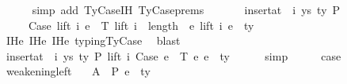 \begin{isabellebody}
\ \ \ \ \isamarkupfalse%
\ {\isacharparenleft}{\kern0pt}simp\ add{\isacharcolon}{\kern0pt}\ TyCase{\isachardot}{\kern0pt}IH{\isacharparenleft}{\kern0pt}{}{\isacharparenright}{\kern0pt}\ TyCase{\isachardot}{\kern0pt}prems{\isacharparenright}{\kern0pt}\isanewline
\isanewline
\ \ \isamarkupfalse%
\isanewline
\ \ \ \ {\isachardoublequoteopen}insert{\isacharunderscore}{\kern0pt}at\ {\isasymGamma}\ i\ {\isacharparenleft}{\kern0pt}ys{\isacharcomma}{\kern0pt}\ ty{}{\isacharparenright}{\kern0pt}\ {\isasymturnstile}{\isacharbraceleft}{\kern0pt}P{\isacharbraceright}{\kern0pt}\isanewline
\ \ \ \ \ Case\ {\isacharparenleft}{\kern0pt}lift\ i\ e{}{\isacharparenright}{\kern0pt}\ {\isasymGamma}{}\ T\ {\isacharparenleft}{\kern0pt}lift\ {\isacharparenleft}{\kern0pt}i\ {\isacharplus}{\kern0pt}\ length\ {\isasymGamma}{}{\isacharparenright}{\kern0pt}\ e{}{\isacharparenright}{\kern0pt}\ {\isacharparenleft}{\kern0pt}lift\ i\ e{}{\isacharparenright}{\kern0pt}\ {\isacharcolon}{\kern0pt}\ ty{}{\isacharprime}{\kern0pt}{\isachardoublequoteclose}\isanewline
\ \ \ \ \isamarkupfalse%
\ IHe{}\ IHe{}\ IHe{}\ typing{\isachardot}{\kern0pt}TyCase\ \isamarkupfalse%
\ blast\isanewline
\ \ \isamarkupfalse%
\ \isamarkupfalse%
\ {\isachardoublequoteopen}insert{\isacharunderscore}{\kern0pt}at\ {\isasymGamma}\ i\ {\isacharparenleft}{\kern0pt}ys{\isacharcomma}{\kern0pt}\ ty{}{\isacharparenright}{\kern0pt}\ {\isasymturnstile}{\isacharbraceleft}{\kern0pt}P{\isacharbraceright}{\kern0pt}\ lift\ i\ {\isacharparenleft}{\kern0pt}Case\ e{}\ {\isasymGamma}{}\ T\ e{}\ e{}{\isacharparenright}{\kern0pt}\ {\isacharcolon}{\kern0pt}\ ty{}{\isacharprime}{\kern0pt}{\isachardoublequoteclose}\isanewline
\ \ \ \ \isamarkupfalse%
\ simp\isanewline
\ \ \isamarkupfalse%
\ \isamarkupfalse%
\ {\isacharquery}{\kern0pt}case\ \isakeywordONE{{\isachardot}{\kern0pt}}\isamarkupfalse%
\isanewline
{}\isamarkupfalse%
%
\endisatagproof
{\isafoldproof}%
%
\isadelimproof
\isanewline
%
\endisadelimproof
\isanewline
\isanewline
{}\isamarkupfalse%
\ weakening{\isacharunderscore}{\kern0pt}left{\isacharcolon}{\kern0pt}\isanewline
\ \ \ A{}{\isacharcolon}{\kern0pt}\ {\isachardoublequoteopen}{\isasymGamma}\ {\isasymturnstile}{\isacharbraceleft}{\kern0pt}P{\isacharbraceright}{\kern0pt}\ e\ {\isacharcolon}{\kern0pt}\ ty{\isachardoublequoteclose}\isanewline

\end{isabellebody}
